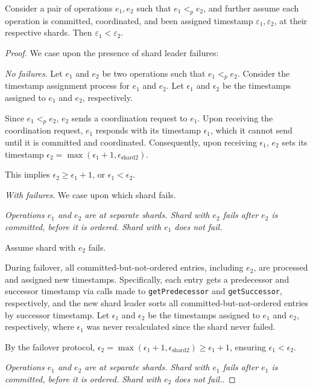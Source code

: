 \begin{lem}
\label{lemma1}
Consider a pair of operations $e_1, e_2$ such that $e_1 <_p e_2$, and further assume each operation is committed, coordinated, and been assigned timestamp $\varepsilon_1, \varepsilon_2$, at their respective shards. Then $\varepsilon_1 < \varepsilon_2$.
\end{lem}
\begin{proof}
We case upon the presence of shard leader failures:


 \textit{No failures}.
Let $e_1$ and $e_2$ be two operations such that $e_1 <_p e_2$.
Consider the timestamp assignment process for $e_1$ and $e_2$. Let $\epsilon_1$ and $\epsilon_2$ be the timestamps assigned to $e_1$ and $e_2$, respectively.

Since $e_1 <_p e_2$, $e_2$ sends a coordination request to $e_1$. Upon receiving the coordination request, $e_1$ responds with its timestamp $\epsilon_1$, which it cannot send until it is committed and coordinated. Consequently, upon receiving $\epsilon_1$, $e_2$ sets its timestamp $\epsilon_2 = \max(\epsilon_1 + 1, \epsilon_{\text{shard}2})$.

This implies $\epsilon_2 \geq \epsilon_1 + 1$, or $\epsilon_1 < \epsilon_2$.

 \textit{With failures}.
We case upon which shard fails.

 \textit{Operations $e_1$ and $e_2$ are at separate shards. Shard with $e_2$ fails after $e_2$ is \textit{committed}, before it is \textit{ordered}. Shard with $e_1$ does not fail.}

Assume shard with $e_2$ fails.

During failover, all committed-but-not-ordered entries, including $e_2$, are processed and assigned new timestamps. Specifically, each entry gets a predecessor and successor timestamp via calls made to \texttt{getPredecessor} and \texttt{getSuccessor}, respectively, and the new shard leader sorts all committed-but-not-ordered entries by successor timestamp. Let $\epsilon_1$ and $\epsilon_2$ be the timestamps assigned to $e_1$ and $e_2$, respectively, where $\epsilon_1$ was never recalculated since the shard never failed.

By the failover protocol, $\epsilon_2 = \max(\epsilon_1 + 1, \epsilon_{\text{shard}2}) \geq \epsilon_1 + 1$, ensuring $\epsilon_1 < \epsilon_2$.

 \textit{Operations $e_1$ and $e_2$ are at separate shards. Shard with $e_1$ fails after $e_1$ is \textit{committed}, before it is \textit{ordered}. Shard with $e_2$ does not fail.}.


\end{proof}
